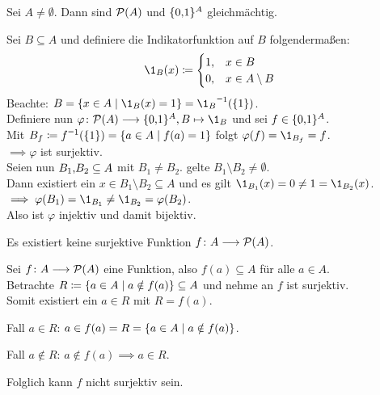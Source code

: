 \documentclass[../ana1.tex]{subfiles}
\begin{document}
\begin{lem}\label{satz:bij_pow}
	Sei \(A \neq \emptyset \). Dann sind \( \mathcal{P}(A) \) und \(\{0 \text{,} 1\}^A \) gleichmächtig.
\end{lem}
\begin{bew}
	Sei \(B \subseteq A \) und definiere die Indikatorfunktion auf \(B \) folgendermaßen:
	\[ \1_B(x) \coloneqq \begin{cases}
			1 \ko & x \in B \\
			0 \ko & x \in A \setminus B
		\end{cases}\]
	Beachte: \(B = \set{x \in A \; | \; \1_B(x) = 1 } = \inverse{\1_B}(\set{1}) \). \\
	Definiere nun \( \varphi \colon \PO(A) \longrightarrow \set{0 \ko 1}^A \ko \, B \mapsto \1_B \) und sei \(f \in \{0 \text{,} 1\}^A \). \\
	Mit \(B_f \coloneqq \inverse{f}(\set{1}) = \set{a \in A \; \vert \; f(a) = 1} \)
	folgt \(\varphi(f) = \1_{B_f} = f \). \\
	\(\implies \varphi \) ist surjektiv. \\
	Seien nun \(B_1 \text{,} B_2 \subseteq A \) mit \(B_1 \neq B_2 \). \obda gelte \(B_1 \setminus B_2 \neq \emptyset \). \\
	Dann existiert ein \(x \in B_1 \setminus B_2 \subseteq A \) und es gilt \(\1_{B_1}(x) = 0 \neq 1 = \1_{B_2}(x) \). \\
	\(\implies \varphi(B_1) = \1_{B_1} \neq \1_{B_2} = \varphi(B_2) \). \\
	Also ist \(\varphi \) injektiv und damit bijektiv.
\end{bew}

\begin{lem}
	Es existiert keine surjektive Funktion \(f \colon A \longrightarrow \mathcal{P}(A) \).
\end{lem}
\begin{bew}
	Sei \(f \colon A \longrightarrow \mathcal{P}(A) \) eine Funktion, also \(f(a) \subseteq A \) für alle \(a \in A \). \\
	Betrachte \(R \coloneqq \{a \in A \; \vert \; a \notin f(a)\} \subseteq A \) und nehme an \(f \)  ist surjektiv. \\
	Somit existiert ein \(a \in R \) mit \(R = f(a)\).
	\begin{faelle}
		\item[Fall \(a \in R \):] \(a \in f(a) = R =  \{a \in A \; \vert \; a \notin f(a)\} \). \Lightning{}
		\item[Fall \(a \notin R\):] \(a \notin f(a) \implies a \in R \). \Lightning{} 
	\end{faelle}
	Folglich kann \(f \) nicht surjektiv sein.
\end{bew}

\end{document}
